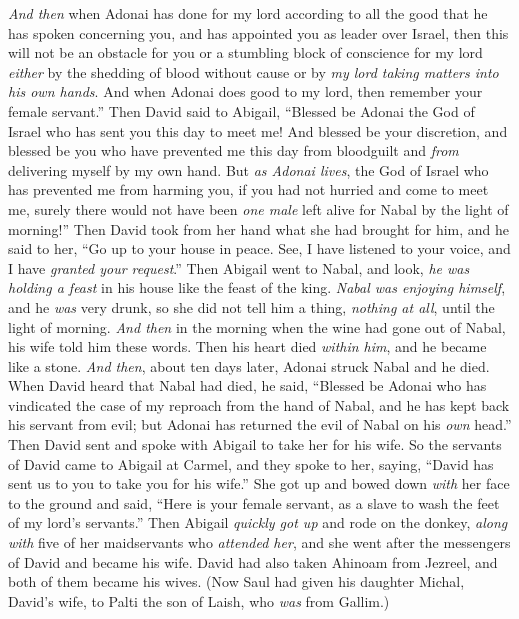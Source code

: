 \begin{biblechapter}
\verse \textit{And then} when Adonai has done for my lord according to all the good that he has spoken concerning you, and has appointed you as leader over Israel,
\verse then this will not be an obstacle for you or a stumbling block of conscience for my lord \textit{either} by the shedding of blood without cause or by \textit{my lord taking matters into his own hands}. And when Adonai does good to my lord, then remember your female servant.”
\verse Then David said to Abigail, “Blessed be Adonai the God of Israel who has sent you this day to meet me!
\verse And blessed be your discretion, and blessed be you who have prevented me this day from bloodguilt and \textit{from} delivering myself by my own hand.
\verse But \textit{as Adonai lives}, the God of Israel who has prevented me from harming you, if you had not hurried and come to meet me, surely there would not have been \textit{one male} left alive for Nabal by the light of morning!”
\verse Then David took from her hand what she had brought for him, and he said to her, “Go up to your house in peace. See, I have listened to your voice, and I have \textit{granted your request}.”
\verse Then Abigail went to Nabal, and look, \textit{he was holding a feast} in his house like the feast of the king. \textit{Nabal was enjoying himself}, and he \textit{was} very drunk, so she did not tell him a thing, \textit{nothing at all}, until the light of morning.
\verse \textit{And then} in the morning when the wine had gone out of Nabal, his wife told him these words. Then his heart died \textit{within him}, and he became like a stone.
\verse \textit{And then}, about ten days later, Adonai struck Nabal and he died.
\verse When David heard that Nabal had died, he said, “Blessed be Adonai who has vindicated the case of my reproach from the hand of Nabal, and he has kept back his servant from evil; but Adonai has returned the evil of Nabal on his \textit{own} head.” Then David sent and spoke with Abigail to take her for his wife.
\verse So the servants of David came to Abigail at Carmel, and they spoke to her, saying, “David has sent us to you to take you for his wife.”
\verse She got up and bowed down \textit{with} her face to the ground and said, “Here is your female servant, as a slave to wash the feet of my lord’s servants.”
\verse Then Abigail \textit{quickly got up} and rode on the donkey, \textit{along with} five of her maidservants who \textit{attended her}, and she went after the messengers of David and became his wife.
\verse David had also taken Ahinoam from Jezreel, and both of them became his wives.
\verse (Now Saul had given his daughter Michal, David’s wife, to Palti the son of Laish, who \textit{was} from Gallim.)
\end{biblechapter}

